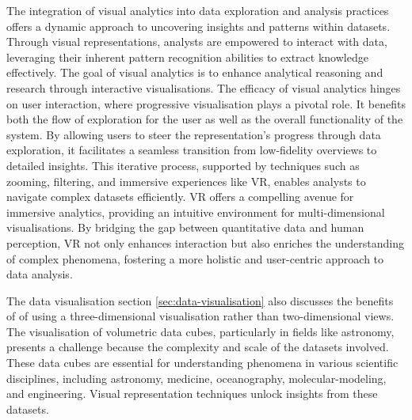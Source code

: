 The integration of visual analytics into data exploration and analysis practices offers a dynamic approach to uncovering insights and patterns within datasets. 
Through visual representations, analysts are empowered to interact with data, leveraging their inherent pattern recognition abilities to extract knowledge effectively. 
The goal of visual analytics is to enhance analytical reasoning and research through interactive visualisations. 
The efficacy of visual analytics hinges on user interaction, where progressive visualisation plays a pivotal role. 
It benefits both the flow of exploration for the user as well as the overall functionality of the system.
By allowing users to steer the representation's progress through data exploration, it facilitates a seamless transition from low-fidelity overviews to detailed insights. 
This iterative process, supported by techniques such as zooming, filtering, and immersive experiences like VR, enables analysts to navigate complex datasets efficiently. 
VR offers a compelling avenue for immersive analytics, providing an intuitive environment for multi-dimensional visualisations. 
By bridging the gap between quantitative data and human perception, VR not only enhances interaction but also enriches the understanding of complex phenomena, fostering a more holistic and user-centric approach to data analysis.

The data visualisation section \ref{sec:data-visualisation} also discusses the benefits of of using a three-dimensional visualisation rather than two-dimensional views. 
The visualisation of volumetric data cubes, particularly in fields like astronomy, presents a challenge because the complexity and scale of the datasets involved. 
These data cubes are essential for understanding phenomena in various scientific disciplines, including astronomy, medicine, oceanography, molecular-modeling, and engineering. 
Visual representation techniques unlock insights from these datasets.

